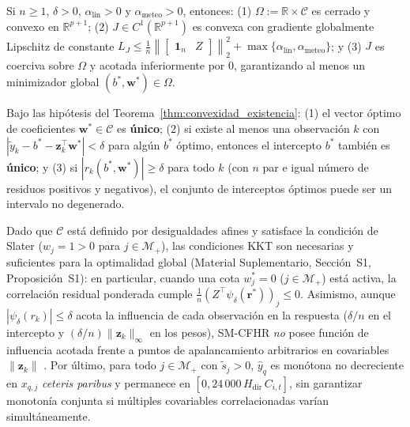 \begin{theorem}\label{thm:convexidad_existencia}
Si $n \ge 1$, $\delta > 0$, $\alpha_{\mathrm{lin}} > 0$ y $\alpha_{\mathrm{meteo}} > 0$, entonces: (1) $\Omega := \mathbb{R} \times \mathcal{C}$ es cerrado y convexo en $\mathbb{R}^{p+1}$; (2) $J \in C^1(\mathbb{R}^{p+1})$ es convexa con gradiente globalmente Lipschitz de constante $L_J \le \frac{1}{n}\left\|\begin{bmatrix}\mathbf{1}_n & Z\end{bmatrix}\right\|_2^2 + \max\{\alpha_{\mathrm{lin}}, \alpha_{\mathrm{meteo}}\}$; y (3) $J$ es coerciva sobre $\Omega$ y acotada inferiormente por $0$, garantizando al menos un minimizador global $(b^*, \mathbf{w}^*) \in \Omega$.
\end{theorem}

\begin{theorem}\label{thm:unicidad}
Bajo las hipótesis del Teorema~\ref{thm:convexidad_existencia}: (1) el vector óptimo de coeficientes $\mathbf{w}^* \in \mathcal{C}$ es \textbf{único}; (2) si existe al menos una observación $k$ con $|\tilde{y}_k - b^* - \mathbf{z}_k^\top \mathbf{w}^*| < \delta$ para algún $b^*$ óptimo, entonces el intercepto $b^*$ también es \textbf{único}; y (3) si $|r_k(b^*,\mathbf{w}^*)| \ge \delta$ para todo $k$ (con $n$ par e igual número de residuos positivos y negativos), el conjunto de interceptos óptimos puede ser un intervalo no degenerado.
\end{theorem}

Dado que $\mathcal{C}$ está definido por desigualdades afines y satisface la condición de Slater ($w_j = 1 > 0$ para $j \in \mathcal{M}_+$), las condiciones KKT son necesarias y suficientes para la optimalidad global (Material Suplementario, Sección~S1, Proposición~S1): en particular, cuando una cota $w_j^* = 0$ ($j \in \mathcal{M}_+$) está activa, la correlación residual ponderada cumple $\frac{1}{n}(Z^\top \psi_\delta(\mathbf{r}^*))_j \le 0$. Asimismo, aunque $|\psi_\delta(r_k)| \le \delta$ acota la influencia de cada observación en la respuesta ($\delta/n$ en el intercepto y $(\delta/n)\|\mathbf{z}_k\|_\infty$ en los pesos), SM-CFHR \emph{no} posee función de influencia acotada frente a puntos de apalancamiento arbitrarios en covariables $\|\mathbf{z}_k\|$ \cite{hampel1986robust}. Por último, para todo $j \in \mathcal{M}_+$ con $\tilde{s}_j > 0$, $\hat{y}_q$ es monótona no decreciente en $x_{q,j}$ \textit{ceteris paribus} y permanece en $[0, 24\,000\,H_{\mathrm{dir}}\,C_{i,t}]$, sin garantizar monotonía conjunta si múltiples covariables correlacionadas varían simultáneamente.

